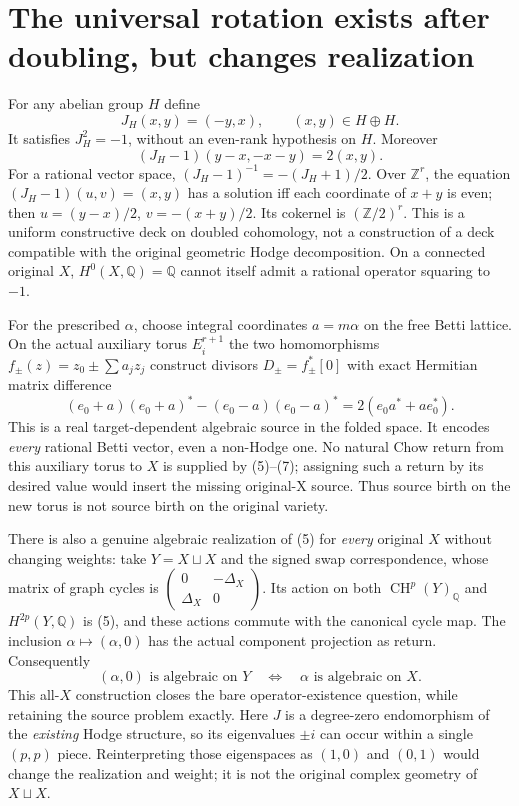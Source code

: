 \documentclass[11pt]{article}
\newcommand{\Q}{\mathbb Q}
\newcommand{\Z}{\mathbb Z}
\newcommand{\CH}{\operatorname{CH}}
\begin{document}
\section{The universal rotation exists after doubling, but changes realization}
For any abelian group $H$ define
\[
 J_H(x,y)=(-y,x),\qquad (x,y)\in H\oplus H.       \tag{5}
\]
It satisfies $J_H^2=-1$, without an even-rank hypothesis on $H$.
Moreover
\[
 (J_H-1)(y-x,-x-y)=2(x,y).                       \tag{6}
\]
For a rational vector space, $(J_H-1)^{-1}=-(J_H+1)/2$.
Over $\Z^r$, the equation $(J_H-1)(u,v)=(x,y)$ has a solution iff
each coordinate of $x+y$ is even; then
$u=(y-x)/2$, $v=-(x+y)/2$. Its cokernel is $(\Z/2)^r$.
This is a uniform constructive deck on doubled cohomology, not a
construction of a deck compatible with the original geometric Hodge
decomposition. On a connected original $X$, $H^0(X,\Q)=\Q$ cannot
itself admit a rational operator squaring to $-1$.

For the prescribed $\alpha$, choose integral coordinates $a=m\alpha$
on the free Betti lattice. On the actual auxiliary torus $E_i^{r+1}$
the two homomorphisms $f_\pm(z)=z_0\pm\sum a_jz_j$ construct divisors
$D_\pm=f_\pm^*[0]$ with exact Hermitian matrix difference
\[
 (e_0+a)(e_0+a)^*-(e_0-a)(e_0-a)^*
       =2(e_0a^*+ae_0^*).                       \tag{7}
\]
This is a real target-dependent algebraic source in the folded space.
It encodes \emph{every} rational Betti vector, even a non-Hodge one.
No natural Chow return from this auxiliary torus to $X$ is supplied
by (5)--(7); assigning such a return by its desired value would insert
the missing original-X source. Thus source birth on the new torus is
not source birth on the original variety.

There is also a genuine algebraic realization of (5) for \emph{every}
original $X$ without changing weights: take $Y=X\sqcup X$ and the
signed swap correspondence, whose matrix of graph cycles is
$\left(\begin{smallmatrix}0&-\Delta_X\\\Delta_X&0\end{smallmatrix}\right)$.
Its action on both $\CH^p(Y)_\Q$ and $H^{2p}(Y,\Q)$ is (5), and these
actions commute with the canonical cycle map. The inclusion
$\alpha\mapsto(\alpha,0)$ has the actual component projection as return.
Consequently
\[
 (\alpha,0)\text{ is algebraic on }Y
       \quad\Longleftrightarrow\quad
 \alpha\text{ is algebraic on }X.                \tag{7a}
\]
This all-$X$ construction closes the bare operator-existence question,
while retaining the source problem exactly. Here $J$ is a degree-zero
endomorphism of the \emph{existing} Hodge structure, so its eigenvalues
$\pm i$ can occur within a single $(p,p)$ piece. Reinterpreting those
eigenspaces as $(1,0)$ and $(0,1)$ would change the realization and
weight; it is not the original complex geometry of $X\sqcup X$.
\end{document}
